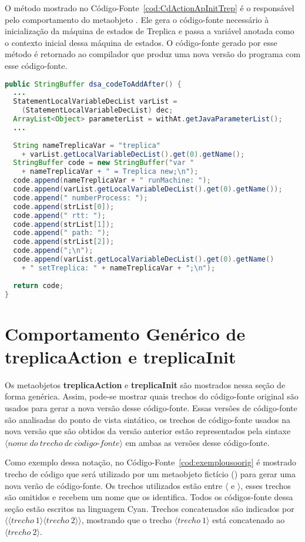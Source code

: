 O método  mostrado no Código-Fonte~\ref{cod:CdActionApInitTrep} é o responsável pelo comportamento do metaobjeto . Ele gera o código-fonte necessário à inicialização da máquina de estados de Treplica e passa a variável anotada como o contexto inicial dessa máquina de estados. O código-fonte gerado por esse método é retornado ao compilador que produz uma nova versão do programa com esse código-fonte. 

\begin{lstlisting}[language=Java, caption={Método principal do metaobjeto \textbf{treplicaInit}}, label={cod:CdActionApInitTrep}, frame=TLBR]
public StringBuffer dsa_codeToAddAfter() {
  ...
  StatementLocalVariableDecList varList = 
    (StatementLocalVariableDecList) dec;
  ArrayList<Object> parameterList = withAt.getJavaParameterList();
  ...
	
  String nameTreplicaVar = "treplica" 
    + varList.getLocalVariableDecList().get(0).getName();
  StringBuffer code = new StringBuffer("var " 
    + nameTreplicaVar + " = Treplica new;\n");
  code.append(nameTreplicaVar + " runMachine: ");
  code.append(varList.getLocalVariableDecList().get(0).getName());
  code.append(" numberProcess: ");
  code.append(strList[0]); 
  code.append(" rtt: ");
  code.append(strList[1]); 
  code.append(" path: ");
  code.append(strList[2]); 
  code.append(";\n");
  code.append(varList.getLocalVariableDecList().get(0).getName() 
    + " setTreplica: " + nameTreplicaVar + ";\n");
	
  return code;
}
\end{lstlisting}

\section{Comportamento Genérico de \textbf{treplicaAction} e \textbf{treplicaInit}}

Os metaobjetos \textbf{treplicaAction} e \textbf{treplicaInit} são mostrados nessa seção de forma genérica. Assim, pode-se mostrar quais trechos do código-fonte original são usados para gerar a nova versão desse código-fonte. Essas versões de código-fonte são analisadas do ponto de vista sintático, os trechos de código-fonte usados na nova versão que são obtidos da versão anterior estão representados pela sintaxe $\langle nome\ do\ trecho\ de\ c\acute{o}digo\mbox{-}fonte \rangle$ em ambas as versões desse código-fonte.

Como exemplo dessa notação, no Código-Fonte~\ref{cod:exemplousoorig} é mostrado trecho de código que será utilizado por um metaobjeto fictício () para gerar uma nova verão de código-fonte. Os trechos utilizados estão entre $\langle$ e $\rangle$, esses trechos são omitidos e recebem um nome que os identifica. Todos os códigos-fonte dessa seção estão escritos na linguagem Cyan. Trechos concatenados são indicados por $\langle \langle trecho\ 1 \rangle\langle trecho\ 2 \rangle \rangle$, mostrando que o trecho $\langle trecho\ 1 \rangle$ está concatenado ao $\langle trecho\ 2 \rangle$.

